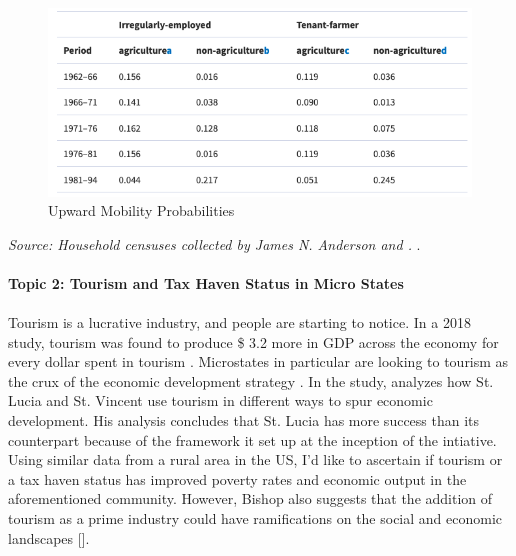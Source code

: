 \documentclass{article}
\begin{document}
\begin{figure}[!h]
    \centering
    \begin{minipage}{0.6\textwidth}
        \centering
        \caption{Upward Mobility Probabilities}
        \label{fig:econmobil}
        \includegraphics[scale=.4]{econmobil.png}
    \end{minipage} \hspace{0.5cm}
    \end{figure}
    \textit{Source: Household censuses collected by James N. Anderson and .} \cite{fuwa2007pathways}.
    \paragraph*{Topic 2: Tourism and Tax Haven Status in Micro States}
      \paragraph{}  Tourism is a lucrative industry, and people are starting to notice.
   In a 2018 study, tourism was found to produce \$ 3.2 more in GDP across the economy for every dollar spent in tourism .
    Microstates in particular are looking to tourism as the crux of the economic development strategy \cite{bishop2010tourism}. 
    In the study,  analyzes how St. Lucia and St. Vincent use tourism in different ways to spur economic development.
    His analysis concludes that St. Lucia has more success than its counterpart because of the framework it set up at the inception of the intiative.
    Using similar data from a rural area in the US, I'd like to ascertain if tourism or a tax haven status has improved poverty rates and economic output in the aforementioned community.
    However, Bishop also suggests that the addition of tourism as a prime industry could have ramifications on the social and economic landscapes [].
    \pagebreak
\end{document}
